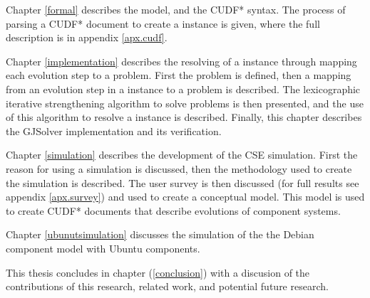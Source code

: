 Chapter \ref{formal} describes the \modelname model, and the CUDF* syntax.
The process of parsing a CUDF* document to create a \modelname instance is given, where the full description is in appendix \ref{apx.cudf}.

Chapter \ref{implementation} describes the resolving of a \modelname instance through mapping each evolution step to a \modelimpl problem.
First the \modelimpl problem is defined, then a mapping from an evolution step in a \modelname instance to a \modelimpl problem is described.
The lexicographic iterative strengthening algorithm to solve \modelimpl problems is then presented, and the use of this algorithm to resolve a \modelname instance is described.
Finally, this chapter describes the GJSolver implementation and its verification.

Chapter \ref{simulation} describes the development of the CSE simulation.
First the reason for using a simulation is discussed, then the methodology used to create the simulation is described.
The user survey is then discussed (for full results see appendix \ref{apx.survey}) and used to create a conceptual model.
This model is used to create CUDF* documents that describe evolutions of component systems. 

Chapter \ref{ubunutsimulation} discusses the simulation of the  the Debian component model \citep{Barth2005} with Ubuntu  components. 

This thesis concludes in chapter (\ref{conclusion}) with a discusion of the contributions of this research, related work, and potential future research.
